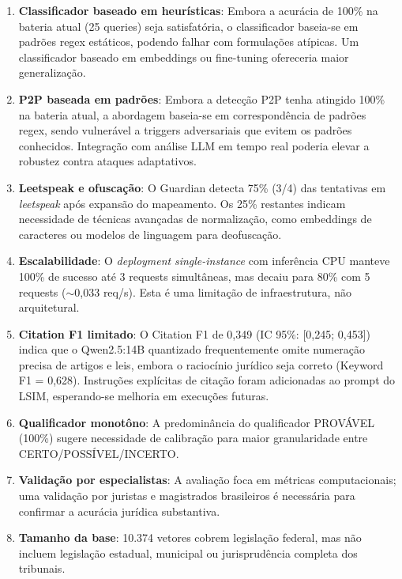 \documentclass[journal,10pt]{IEEEtran}
\begin{document}
\begin{enumerate}
    \item \textbf{Classificador baseado em heur\'{i}sticas}: Embora a acur\'{a}cia de 100\% na bateria atual (25 queries) seja satisfat\'{o}ria, o classificador baseia-se em padr\~{o}es regex est\'{a}ticos, podendo falhar com formula\c{c}\~{o}es at\'{i}picas. Um classificador baseado em embeddings ou fine-tuning ofereceria maior generaliza\c{c}\~{a}o.

    \item \textbf{P2P baseada em padr\~{o}es}: Embora a detec\c{c}\~{a}o P2P tenha atingido 100\% na bateria atual, a abordagem baseia-se em correspond\^{e}ncia de padr\~{o}es regex, sendo vulner\'{a}vel a triggers adversariais que evitem os padr\~{o}es conhecidos. Integra\c{c}\~{a}o com an\'{a}lise LLM em tempo real poderia elevar a robustez contra ataques adaptativos.

    \item \textbf{Leetspeak e ofusca\c{c}\~{a}o}: O Guardian detecta 75\% (3/4) das tentativas em \textit{leetspeak} ap\'{o}s expans\~{a}o do mapeamento. Os 25\% restantes indicam necessidade de t\'{e}cnicas avan\c{c}adas de normaliza\c{c}\~{a}o, como embeddings de caracteres ou modelos de linguagem para deofusca\c{c}\~{a}o.

    \item \textbf{Escalabilidade}: O \textit{deployment} \textit{single-instance} com infer\^{e}ncia CPU manteve 100\% de sucesso at\'{e} 3 requests simult\^{a}neas, mas decaiu para 80\% com 5 requests ($\sim$0{,}033 req/s). Esta \'{e} uma limita\c{c}\~{a}o de infraestrutura, n\~{a}o arquitetural.

    \item \textbf{Citation F1 limitado}: O Citation F1 de 0{,}349 (IC 95\%: [0{,}245; 0{,}453]) indica que o Qwen2.5:14B quantizado frequentemente omite numera\c{c}\~{a}o precisa de artigos e leis, embora o racioc\'{i}nio jur\'{i}dico seja correto (Keyword F1 = 0{,}628). Instru\c{c}\~{o}es expl\'{i}citas de cita\c{c}\~{a}o foram adicionadas ao prompt do LSIM, esperando-se melhoria em execu\c{c}\~{o}es futuras.

    \item \textbf{Qualificador monot\^{o}no}: A predomin\^{a}ncia do qualificador PROV\'{A}VEL (100\%) sugere necessidade de calibra\c{c}\~{a}o para maior granularidade entre CERTO/POSS\'{I}VEL/INCERTO.

    \item \textbf{Valida\c{c}\~{a}o por especialistas}: A avalia\c{c}\~{a}o foca em m\'{e}tricas computacionais; uma valida\c{c}\~{a}o por juristas e magistrados brasileiros \'{e} necess\'{a}ria para confirmar a acur\'{a}cia jur\'{i}dica substantiva.

    \item \textbf{Tamanho da base}: 10.374 vetores cobrem legisla\c{c}\~{a}o federal, mas n\~{a}o incluem legisla\c{c}\~{a}o estadual, municipal ou jurisprud\^{e}ncia completa dos tribunais.
\end{enumerate}
\end{document}
